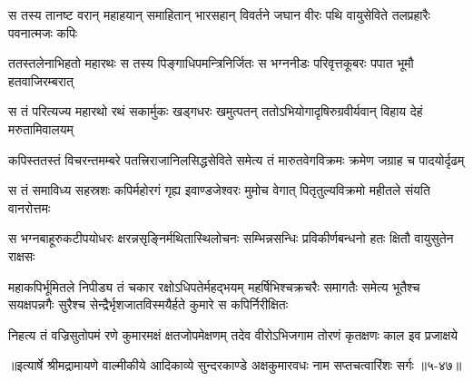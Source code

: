 \twolineshloka
{स तस्य तानष्ट वरान् महाहयान् समाहितान् भारसहान् विवर्तने}
{जघान वीरः पथि वायुसेविते तलप्रहारैः पवनात्मजः कपिः} %

\twolineshloka
{ततस्तलेनाभिहतो महारथः स तस्य पिङ्गाधिपमन्त्रिनिर्जितः}
{स भग्ननीडः परिवृत्तकूबरः पपात भूमौ हतवाजिरम्बरात्} %

\twolineshloka
{स तं परित्यज्य महारथो रथं सकार्मुकः खड्गधरः खमुत्पतन्}
{ततोऽभियोगादृषिरुग्रवीर्यवान् विहाय देहं मरुतामिवालयम्} %

\twolineshloka
{कपिस्ततस्तं विचरन्तमम्बरे पतत्त्रिराजानिलसिद्धसेविते}
{समेत्य तं मारुतवेगविक्रमः क्रमेण जग्राह च पादयोर्दृढम्} %

\twolineshloka
{स तं समाविध्य सहस्रशः कपिर्महोरगं गृह्य इवाण्डजेश्वरः}
{मुमोच वेगात् पितृतुल्यविक्रमो महीतले संयति वानरोत्तमः} %

\twolineshloka
{स भग्नबाहूरुकटीपयोधरः क्षरन्नसृङ्निर्मथितास्थिलोचनः}
{सम्भिन्नसन्धिः प्रविकीर्णबन्धनो हतः क्षितौ वायुसुतेन राक्षसः} %

\threelineshloka
{महाकपिर्भूमितले निपीड्य तं चकार रक्षोऽधिपतेर्महद्भयम्}
{महर्षिभिश्चक्रचरैः समागतैः समेत्य भूतैश्च सयक्षपन्नगैः}
{सुरैश्च सेन्द्रैर्भृशजातविस्मयैर्हते कुमारे स कपिर्निरीक्षितः} %

\twolineshloka
{निहत्य तं वज्रिसुतोपमं रणे कुमारमक्षं क्षतजोपमेक्षणम्}
{तदेव वीरोऽभिजगाम तोरणं कृतक्षणः काल इव प्रजाक्षये} %


॥इत्यार्षे श्रीमद्रामायणे वाल्मीकीये आदिकाव्ये सुन्दरकाण्डे अक्षकुमारवधः नाम सप्तचत्वारिंशः सर्गः ॥५-४७॥
